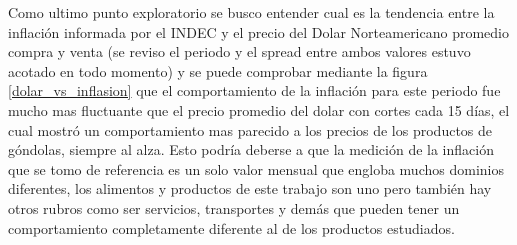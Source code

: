 Como ultimo punto exploratorio se busco entender cual es la tendencia entre la inflación informada por el INDEC \cite{indec} y el precio del Dolar Norteamericano \cite{cotDolar} promedio compra y venta (se reviso el periodo y el spread entre ambos valores estuvo acotado en todo momento) y se puede comprobar mediante la figura \ref{dolar_vs_inflasion} que el comportamiento de la inflación para este periodo fue mucho mas fluctuante que el precio promedio del dolar con cortes cada 15 días, el cual mostró un comportamiento mas parecido a los precios de los productos de góndolas, siempre al alza. Esto podría deberse a que la medición de la inflación que se tomo de referencia es un solo valor mensual que engloba muchos dominios diferentes, los alimentos y productos de este trabajo son uno pero también hay otros rubros como ser servicios, transportes y demás que pueden tener un comportamiento completamente diferente al de los productos estudiados.